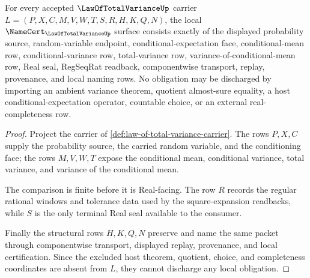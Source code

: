 \begin{theorem}
\label{thm:law-of-total-variance-namecert-obligations}
For every accepted $\LawOfTotalVarianceUp$ carrier $L=(P,X,C,M,V,W,T,S,R,H,K,Q,N)$, the local $\NameCert_{\LawOfTotalVarianceUp}$ surface consists exactly of the displayed probability source, random-variable endpoint, conditional-expectation face, conditional-mean row, conditional-variance row, total-variance row, variance-of-conditional-mean row, Real seal, RegSeqRat readback, componentwise transport, replay, provenance, and local naming rows. No obligation may be discharged by importing an ambient variance theorem, quotient almost-sure equality, a host conditional-expectation operator, countable choice, or an external real-completeness row.
\end{theorem}
\begin{proof}
Project the carrier of \autoref{def:law-of-total-variance-carrier}. The rows $P,X,C$ supply the probability source, the carried random variable, and the conditioning face; the rows $M,V,W,T$ expose the conditional mean, conditional variance, total variance, and variance of the conditional mean.

The comparison is finite before it is Real-facing. The row $R$ records the regular rational windows and tolerance data used by the square-expansion readbacks, while $S$ is the only terminal Real seal available to the consumer.

Finally the structural rows $H,K,Q,N$ preserve and name the same packet through componentwise transport, displayed replay, provenance, and local certification. Since the excluded host theorem, quotient, choice, and completeness coordinates are absent from $L$, they cannot discharge any local obligation.
\end{proof}

